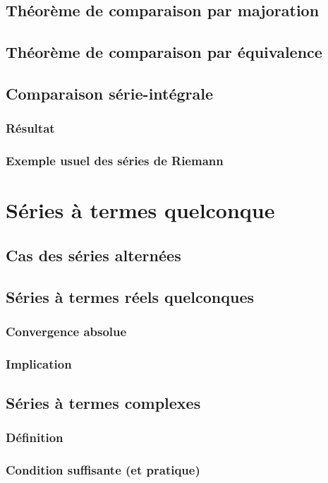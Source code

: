 \documentclass[12pt,a4paper,french]{book}
\begin{document}
		\subsection{Théorème de comparaison par majoration}
		\subsection{Théorème de comparaison par équivalence}
		\subsection{Comparaison série-intégrale}
			\subsubsection{Résultat}
			\subsubsection{Exemple usuel des séries de Riemann}
	\section{Séries à termes quelconque}
		\subsection{Cas des séries alternées}
		\subsection{Séries à termes réels quelconques}
			\subsubsection{Convergence absolue}
			\subsubsection{Implication}
		\subsection{Séries à termes complexes}
			\subsubsection{Définition}
			\subsubsection{Condition suffisante (et pratique)}
\end{document}

